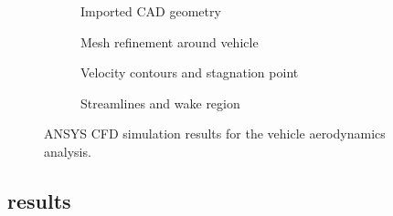 \documentclass[12pt, a4paper]{article}
\begin{document}
	\begin{figure}[htbp]
		\centering
		\begin{subfigure}[b]{0.48\textwidth}
			\centering
			\caption{Imported CAD geometry}
			\label{fig:cad_geom}
		\end{subfigure}
		\hfill %
		\begin{subfigure}[b]{0.48\textwidth}
			\centering
			\caption{Mesh refinement around vehicle}
			\label{fig:mesh}
		\end{subfigure}
		
		\vspace{0.5cm} %
		
		\begin{subfigure}[b]{0.48\textwidth}
			\centering
			\caption{Velocity contours and stagnation point}
			\label{fig:contour}
		\end{subfigure}
		\hfill
		\begin{subfigure}[b]{0.48\textwidth}
			\centering
			\caption{Streamlines and wake region}
			\label{fig:wake}
		\end{subfigure}
		
		\caption{ANSYS CFD simulation results for the vehicle aerodynamics analysis.}
		\label{fig:all_results}
	\end{figure}
			
		\subsection{results}
		
\end{document}
